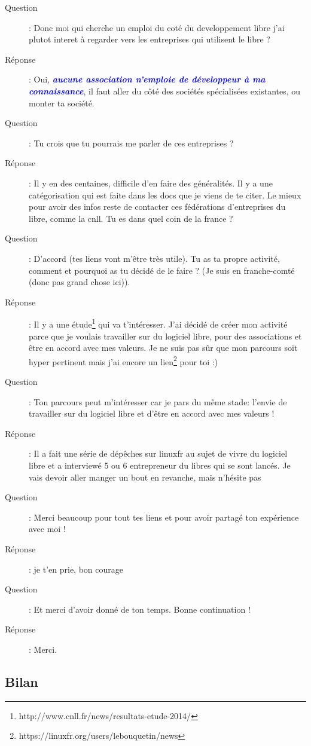 \documentclass[a4paper,12pt, draft]{report}
\newcommand{\importantPoint}[1]{\textcolor{blue}{\textbf{\textit{#1}}}}
\begin{document}
\begin{description}
\item [Question]:  Donc moi qui cherche un emploi du coté du developpement libre j'ai plutot interet à regarder vers les entreprises qui utilisent le libre ?
\item [Réponse]:  Oui, \importantPoint{aucune association n'emploie de développeur à ma connaissance}, il faut aller du côté des sociétés spécialisées existantes, ou monter ta société.
\item [Question]:  Tu crois que tu pourrais me parler de ces entreprises ?
\item [Réponse]:  Il y en des centaines, difficile d'en faire des généralités. Il y a une catégorisation qui est faite dans les docs que je viens de te citer. Le mieux pour avoir des infos reste de contacter ces fédérations d'entreprises du libre, comme la cnll. Tu es dans quel coin de la france ?
\item [Question]:  D'accord (tes liens vont m'être très utile). Tu as ta propre activité, comment et  pourquoi as tu décidé de le faire ? (Je suis en franche-comté (donc pas grand chose ici)).
\item [Réponse]:  Il y a une étude\footnote{http://www.cnll.fr/news/resultats-etude-2014/} qui va t'intéresser. J'ai décidé de créer mon activité parce que je voulais travailler sur du logiciel libre, pour des associations et être en accord avec mes valeurs. Je ne suis pas sûr que mon parcours soit hyper pertinent mais j'ai encore un lien\footnote{https://linuxfr.org/users/lebouquetin/news} pour toi :)
\item [Question]:  Ton parcours peut m'intéresser car je pars du même stade: l'envie de travailler sur du logiciel libre et d'être en accord avec mes valeurs !
\item [Réponse]:  Il a fait une série de dépêches sur linuxfr au sujet de vivre du logiciel libre et a interviewé 5 ou 6 entrepreneur du libres qui se sont lancés. Je vais devoir aller manger un bout en revanche, mais n'hésite pas
\item [Question]:  Merci beaucoup pour tout tes liens et pour avoir partagé ton expérience avec moi !
\item [Réponse]:  je t'en prie, bon courage
\item [Question]:  Et merci d'avoir donné de ton temps. Bonne continuation !
\item [Réponse]:  Merci.
\end{description}
\newpage
\subsection{Bilan}
\end{document}
